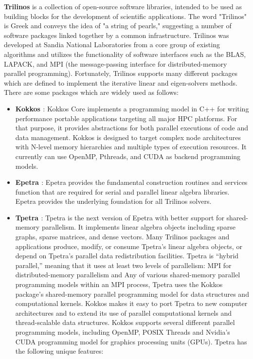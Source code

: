 \textbf{Trilinos} \cite{heroux2005overview} is a collection of open-source software libraries, intended to be used as building blocks for the development of scientific applications. The word "Trilinos" is Greek and conveys the idea of "a string of pearls," suggesting a number of software packages linked together by a common infrastructure. Trilinos was developed at Sandia National Laboratories from a core group of existing algorithms and utilizes the functionality of software interfaces such as the BLAS, LAPACK, and MPI (the message-passing interface for distributed-memory parallel programming). Fortunately, Trilinos supports many different packages which are defined to implement the iterative linear and eigen-solvers methods. There are some packages which are widely used as follows:

\begin{itemize}
	\item \textbf{Kokkos \cite{edwards2014kokkos}}: Kokkos Core implements a programming model in C++ for writing performance portable applications targeting all major HPC platforms. For that purpose, it provides abstractions for both parallel executions of code and data management. Kokkos is designed to target complex node architectures with N-level memory hierarchies and multiple types of execution resources. It currently can use OpenMP, Pthreads, and CUDA as backend programming models.
	\item \textbf{Epetra \cite{heroux2005epetra}}: Epetra provides the fundamental construction routines and services function that are required for serial and parallel linear algebra libraries. Epetra provides the underlying foundation for all Trilinos solvers.
	
	\item \textbf{Tpetra \cite{baker2012tpetra}}: Tpetra is the next version of Epetra with better support for shared-memory parallelism. It implements linear algebra objects including sparse graphs, sparse matrices, and dense vectors.  Many Trilinos packages and applications produce, modify, or consume Tpetra’s linear algebra objects, or depend on Tpetra’s parallel data redistribution facilities. Tpetra is “hybrid parallel,” meaning that it uses at least two levels of parallelism: MPI  for distributed-memory parallelism and Any of various shared-memory parallel programming models within an MPI process, Tpetra uses the Kokkos package’s shared-memory parallel programming model for data structures and computational kernels.  Kokkos makes it easy to port Tpetra to new computer architectures and to extend its use of parallel computational kernels and thread-scalable data structures.  Kokkos supports several different parallel programming models, including OpenMP, POSIX Threads and Nvidia’s CUDA programming model for graphics processing units (GPUs). Tpetra has the following unique features:
	

\end{itemize}
